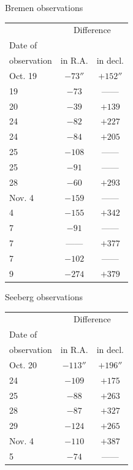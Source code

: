 \begin{center}Bremen observations\end{center}
\begin{center}\fontsize{10}{12}\selectfont\setlength{\tabcolsep}{8pt}\renewcommand{\arraystretch}{1.15}\begin{tabular}{l|c|c}
& \multicolumn{2}{c}{Difference} \\
Date of & & \\
observation & in R.A. & in decl. \\ \hline
Oct. 19 & $-73''$ 
 & $+152''$ \\
19 & $-73$ & ---\;--- \\
20 & $-39$ & $+139$ \\
24 & $-82$ & $+227$ \\
24 & $-84$ & $+205$ \\
25 & $-108$ & ---\;--- \\
25 & $-91$ & ---\;--- \\
28 & $-60$ & $+293$ \\
Nov. 4 & $-159$ & ---\;--- \\
4 & $-155$ & $+342$ \\
7 & $-91$ & ---\;--- \\
7 & ---\;--- & $+377$ \\
7 & $-102$ & ---\;--- \\
9 & $-274$ & $+379$ \\
\end{tabular}\end{center}
\begin{center}Seeberg observations\end{center}
\begin{center}\fontsize{10}{12}\selectfont\setlength{\tabcolsep}{8pt}\renewcommand{\arraystretch}{1.15}\begin{tabular}{l|c|c}
& \multicolumn{2}{c}{Difference} \\
Date of & & \\
observation & in R.A. & in decl. \\ \hline
Oct. 20 & $-113''$ & $+196''$ \\
24 & $-109$ & $+175$ \\
25 & $-88$ & $+263$ \\
28 & $-87$ & $+327$ \\
29 & $-124$ & $+265$ \\
Nov. 4 & $-110$ & $+387$ \\
5 & $-74$ & ---\;--- \\
\end{tabular}\end{center}


